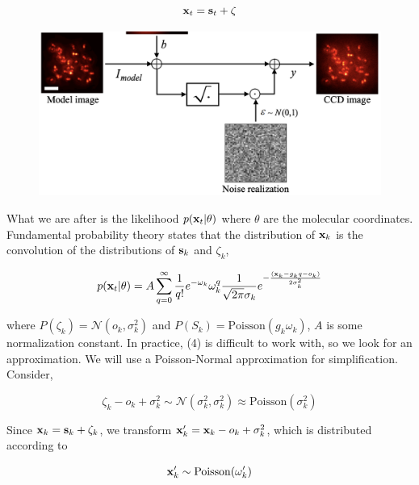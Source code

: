 \documentclass{article}
\begin{document}
\begin{equation}
\bold{x}_t = \bold{s}_t + \bold{\zeta}
\end{equation}


\begin{figure}
\includegraphics[scale=0.5]{Generation.png}
\end{figure}

What we are after is the likelihood $p(\bold{x}_{t}|\theta)$ where $\theta$ are the molecular coordinates. Fundamental probability theory states that the distribution of $\bold{x}_{k}$ is the convolution of the distributions of $\bold{s}_{k}$ and $\zeta_{k}$,

\begin{equation}
p(\bold{x}_{t}|\theta) = A\sum_{q=0}^{\infty} \frac{1}{q!}e^{-\omega_{k}}\omega_{k}^{q}\frac{1}{\sqrt{2\pi}\sigma_{k}}e^{-\frac{(\bold{x}_{k}-g_{k}q-o_{k})}{2\sigma_{k}^{2}}}
\end{equation}

where $P(\zeta_{k}) = \mathcal{N}(o_{k},\sigma_{k}^{2})$ and $P(S_{k}) = \mathrm{Poisson}(g_{k}\omega_{k})$,  $A$ is some normalization constant. In practice, (4) is difficult to work with, so we look for an approximation. We will use a Poisson-Normal approximation for simplification. Consider,

\begin{equation}
\zeta_{k} - o_{k} + \sigma_{k}^{2} \sim \mathcal{N}(\sigma_{k}^{2},\sigma_{k}^{2}) \approx \mathrm{Poisson}(\sigma_{k}^{2})
\end{equation}

Since $\bold{x}_{k} = \bold{s}_{k} + \zeta_{k}$, we transform $\bold{x}_{k}' = \bold{x}_{k} - o_{k} + \sigma_{k}^{2}$, which is distributed according to 

\begin{equation}
\bold{x}_{k}' \sim \mathrm{Poisson}(\omega_{k}')
\end{equation}
\end{document}
